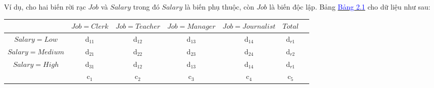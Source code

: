 \hspace*{10mm}Ví dụ, cho hai biến rời rạc $Job$ và $Salary$ trong đó $Salary$ là biến phụ thuộc, còn $Job$ là biến độc lập. Bảng \hyperref[bang_2_1]{\textcolor{blue}{Bảng 2.1}} cho dữ liệu như sau:
\begin{table}[ht]
\begin{center}
\begin{tabular}{|c|c|c|c|c|c|c|}
\hline
& $Job=Clerk$ & $Job=Teacher$ & $Job=Manager$ & $Job=Journalist$ & $Total$ \\
\hline
\hline
$Salary=Low$ & d$_{11}$ & d$_{12}$ & d$_{13}$ & d$_{14}$ & d$_{r1}$ \\
\hline
$Salary=Medium$ & d$_{21}$ & d$_{22}$ & d$_{23}$ & d$_{24}$ & d$_{r2}$ \\
\hline
$Salary=High$ & d$_{31}$ & d$_{12}$ & d$_{13}$ & d$_{14}$ & d$_{r1}$ \\
\hline
& c$_{1}$ & c$_{2}$ & c$_{3}$ & c$_{4}$ & c$_{5}$
\hline

\end{tabular}
\end{center}
\end{table}






